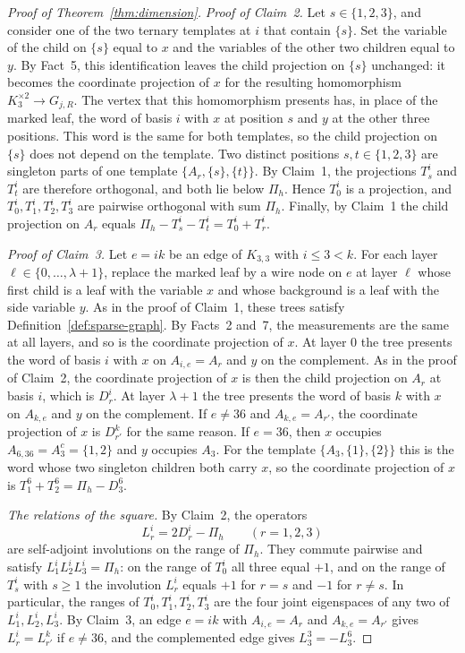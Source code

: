 \begin{proof}[Proof of Theorem~\ref{thm:dimension}]
\emph{Proof of Claim~2.} Let $s\in\{1,2,3\}$, and consider one of the two ternary templates at $i$ that contain $\{s\}$. Set the variable of the child on $\{s\}$ equal to $x$ and the variables of the other two children equal to $y$. By Fact~5, this identification leaves the child projection on $\{s\}$ unchanged: it becomes the coordinate projection of $x$ for the resulting homomorphism $K_3^{\times2}\to G_{j,R}$. The vertex that this homomorphism presents has, in place of the marked leaf, the word of basis $i$ with $x$ at position $s$ and $y$ at the other three positions. This word is the same for both templates, so the child projection on $\{s\}$ does not depend on the template. Two distinct positions $s,t\in\{1,2,3\}$ are singleton parts of one template $\{A_r,\{s\},\{t\}\}$. By Claim~1, the projections $T^i_s$ and $T^i_t$ are therefore orthogonal, and both lie below $\Pi_h$. Hence $T^i_0$ is a projection, and $T^i_0,T^i_1,T^i_2,T^i_3$ are pairwise orthogonal with sum $\Pi_h$. Finally, by Claim~1 the child projection on $A_r$ equals $\Pi_h-T^i_s-T^i_t=T^i_0+T^i_r$.

\emph{Proof of Claim~3.} Let $e=ik$ be an edge of $K_{3,3}$ with $i\le3<k$. For each layer $\ell\in\{0,\ldots,\lambda+1\}$, replace the marked leaf by a wire node on $e$ at layer $\ell$ whose first child is a leaf with the variable $x$ and whose background is a leaf with the side variable $y$. As in the proof of Claim~1, these trees satisfy Definition~\ref{def:sparse-graph}. By Facts~2 and~7, the measurements are the same at all layers, and so is the coordinate projection of $x$. At layer $0$ the tree presents the word of basis $i$ with $x$ on $A_{i,e}=A_r$ and $y$ on the complement. As in the proof of Claim~2, the coordinate projection of $x$ is then the child projection on $A_r$ at basis $i$, which is $D^i_r$. At layer $\lambda+1$ the tree presents the word of basis $k$ with $x$ on $A_{k,e}$ and $y$ on the complement. If $e\ne36$ and $A_{k,e}=A_{r'}$, the coordinate projection of $x$ is $D^k_{r'}$ for the same reason. If $e=36$, then $x$ occupies $A_{6,36}=A_3^c=\{1,2\}$ and $y$ occupies $A_3$. For the template $\{A_3,\{1\},\{2\}\}$ this is the word whose two singleton children both carry $x$, so the coordinate projection of $x$ is $T^6_1+T^6_2=\Pi_h-D^6_3$.

\emph{The relations of the square.} By Claim~2, the operators
\[
 L^i_r=2D^i_r-\Pi_h\qquad(r=1,2,3)
\]
are self-adjoint involutions on the range of $\Pi_h$. They commute pairwise and satisfy $L^i_1L^i_2L^i_3=\Pi_h$: on the range of $T^i_0$ all three equal $+1$, and on the range of $T^i_s$ with $s\ge1$ the involution $L^i_r$ equals $+1$ for $r=s$ and $-1$ for $r\ne s$. In particular, the ranges of $T^i_0,T^i_1,T^i_2,T^i_3$ are the four joint eigenspaces of any two of $L^i_1,L^i_2,L^i_3$. By Claim~3, an edge $e=ik$ with $A_{i,e}=A_r$ and $A_{k,e}=A_{r'}$ gives $L^i_r=L^k_{r'}$ if $e\ne36$, and the complemented edge gives $L^3_3=-L^6_3$.


\end{proof}
